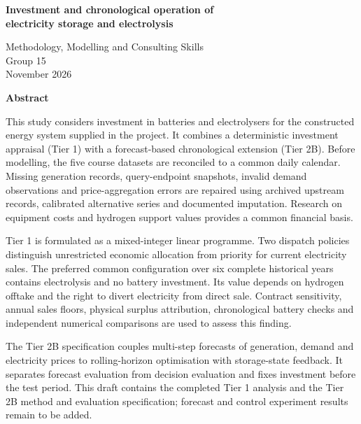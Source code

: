 \documentclass[11pt,a4paper,oneside]{article}
\begin{document}
\begin{center}
{\Large\bfseries Investment and chronological operation of\\[3pt]
electricity storage and electrolysis\par}
\vspace{12pt}
Methodology, Modelling and Consulting Skills\\
Group 15\\
November 2026
\end{center}
\vspace{16pt}
\begin{center}\large\bfseries Abstract\end{center}
\noindent
This study considers investment in batteries and electrolysers for the
constructed energy system supplied in the project. It combines a deterministic
investment appraisal (Tier 1) with a forecast-based chronological extension
(Tier 2B). Before modelling, the five course datasets are reconciled to a
common daily calendar. Missing generation records, query-endpoint snapshots,
invalid demand observations and price-aggregation errors are repaired using
archived upstream records, calibrated alternative series and documented
imputation. Research on equipment costs and hydrogen support values provides
a common financial basis.

Tier 1 is formulated as a mixed-integer linear programme. Two dispatch policies
distinguish unrestricted economic allocation from priority for current
electricity sales. The preferred common configuration over six complete
historical years contains electrolysis and no battery investment. Its value
depends on hydrogen offtake and the right to divert electricity from direct
sale. Contract sensitivity, annual sales floors, physical surplus attribution,
chronological battery checks and independent numerical comparisons are used
to assess this finding.

The Tier 2B specification couples multi-step forecasts of generation, demand
and electricity prices to rolling-horizon optimisation with storage-state
feedback. It separates forecast evaluation from decision evaluation and fixes
investment before the test period. This draft contains the completed Tier 1
analysis and the Tier 2B method and evaluation specification; forecast and
control experiment results remain to be added.
\clearpage
\tableofcontents
\clearpage
{}



\label{body-last}
\clearpage
\setcounter{page}{1}
\renewcommand{\thepage}{R\arabic{page}}

\end{document}
